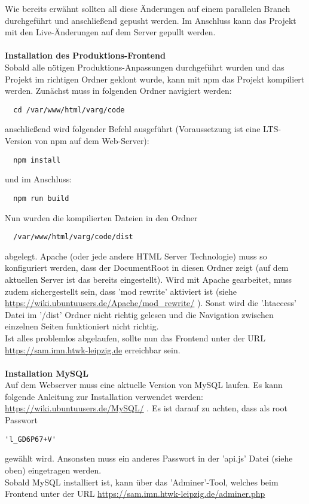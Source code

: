 \documentclass[twoside]{report}
\begin{document}
Wie bereits erwähnt sollten all diese Änderungen auf einem parallelen Branch durchgeführt und anschließend gepusht werden.
Im Anschluss kann das Projekt mit den Live-Änderungen auf dem Server gepullt werden.
\\\\
\textbf{Installation des Produktions-Frontend}
\\Sobald alle nötigen Produktions-Anpassungen durchgeführt wurden und das Projekt im richtigen Ordner geklont wurde, 
kann mit npm das Projekt kompiliert werden. Zunächst muss in folgenden Ordner navigiert werden:
\begin{verbatim}
  cd /var/www/html/varg/code
\end{verbatim}
anschließend wird folgender Befehl ausgeführt (Voraussetzung ist eine LTS-Version von npm auf dem Web-Server):
\begin{verbatim}
  npm install
\end{verbatim}
und im Anschluss:
\begin{verbatim}
  npm run build
\end{verbatim}\newpage
\noindent Nun wurden die kompilierten Dateien in den Ordner
\begin{verbatim}
  /var/www/html/varg/code/dist
\end{verbatim}
abgelegt. Apache (oder jede andere HTML Server Technologie) muss so konfiguriert werden, 
dass der DocumentRoot in diesen Ordner zeigt (auf dem aktuellen Server ist das bereits eingestellt). Wird mit Apache gearbeitet, muss zudem sichergestellt sein, dass 'mod rewrite' aktiviert ist
(siehe \url{https://wiki.ubuntuusers.de/Apache/mod_rewrite/} ). Sonst wird die '.htaccess' Datei im '/dist' Ordner nicht richtig gelesen und 
die Navigation zwischen einzelnen Seiten funktioniert nicht richtig.
\\Ist alles problemlos abgelaufen, sollte nun das Frontend unter der URL \url{https://sam.imn.htwk-leipzig.de} erreichbar sein.
\\\\
\textbf{Installation MySQL}
\\Auf dem Webserver muss eine aktuelle Version von MySQL laufen. Es kann folgende Anleitung zur Installation verwendet werden:
\url{https://wiki.ubuntuusers.de/MySQL/} . Es ist darauf zu achten, dass als root Passwort \begin{verbatim}'l_GD6P67+V'\end{verbatim} gewählt wird. 
Ansonsten muss ein anderes Passwort in der 'api.js' Datei (siehe oben) eingetragen werden.
\\Sobald MySQL installiert ist, kann über das 'Adminer'-Tool, welches beim Frontend unter der URL \url{https://sam.imn.htwk-leipzig.de/adminer.php} 
\end{document}
